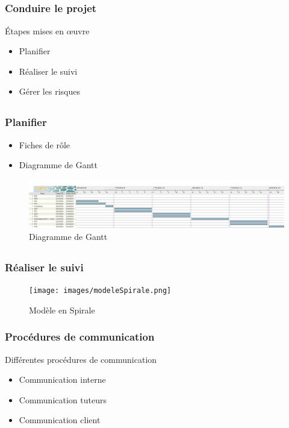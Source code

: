 \subsection{} %

\begin{frame}
\frametitle{Conduire le projet}
Étapes mises en \oe{}uvre
	\begin{itemize}
		\item Planifier
		\item Réaliser le suivi
		\item Gérer les risques
	\end{itemize}
\end{frame}

\subsection{}

\begin{frame}
\frametitle{Planifier}
\begin{itemize}
	\item Fiches de rôle
	\item Diagramme de Gantt
\end{itemize}
\begin{figure}
\begin{center}
	\includegraphics[scale=0.15]{images/exempleGantt.jpg}
	\caption{Diagramme de Gantt}
	\label{DG}
\end{center}
\end{figure}
\end{frame}

\subsection{}

\begin{frame}
\frametitle{Réaliser le suivi}
\begin{figure}
\begin{center}
\texttt{[image: images/modeleSpirale.png]}
\caption{Modèle en Spirale}
\label{MS}
\end{center}
\end{figure}
\end{frame}

\begin{frame}
\frametitle{Procédures de communication}
Différentes procédures de communication
\begin{itemize}
\item Communication interne
\item Communication tuteurs
\item Communication client
\end{itemize}
\end{frame}